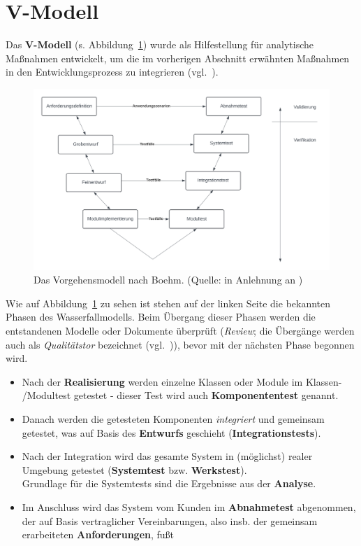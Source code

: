 \section{V-Modell}\label{sec:v-modell}
Das \textbf{V-Modell} (s. Abbildung~\ref{fig:v-modell}) wurde als Hilfestellung für analytische Maßnahmen entwickelt, um die im vorherigen Abschnitt erwähnten Maßnahmen in den Entwicklungsprozess zu integrieren (vgl.~\cite[10]{Wed09c}).

\begin{figure}
    \centering
    \includegraphics[scale=0.3]{chapters/Glossar/img/vmodell}
    \caption{Das Vorgehensmodell nach Boehm. (Quelle: in Anlehnung an \cite[554, Abb. 20.11-2]{Bal08})}
    \label{fig:v-modell}
\end{figure}

\noindent
Wie auf Abbildung~\ref{fig:v-modell} zu sehen ist stehen auf der linken Seite die bekannten Phasen des Wasserfallmodells.
Beim Übergang dieser Phasen werden die entstandenen Modelle oder Dokumente überprüft (\textit{Review}; die Übergänge werden auch als \textit{Qualitätstor} bezeichnet (vgl.~\cite[11]{Wed09c})), bevor mit der nächsten Phase begonnen wird.

\begin{itemize}
    \item Nach der \textbf{Realisierung} werden einzelne Klassen oder Module im Klassen- /Modultest getestet - dieser Test wird auch \textbf{Komponententest} genannt.
    \item Danach werden die getesteten Komponenten \textit{integriert} und gemeinsam getestet, was auf Basis des \textbf{Entwurfs} geschieht (\textbf{Integrationstests}).
    \item Nach der Integration wird das gesamte System in (möglichst) realer Umgebung getestet (\textbf{Systemtest} bzw. \textbf{Werkstest}).\\
    Grundlage für die Systemtests sind die Ergebnisse aus der \textbf{Analyse}.
    \item Im Anschluss wird das System  vom Kunden im \textbf{Abnahmetest} abgenommen, der auf Basis vertraglicher Vereinbarungen, also insb. der gemeinsam erarbeiteten \textbf{Anforderungen}, fußt
\end{itemize}

